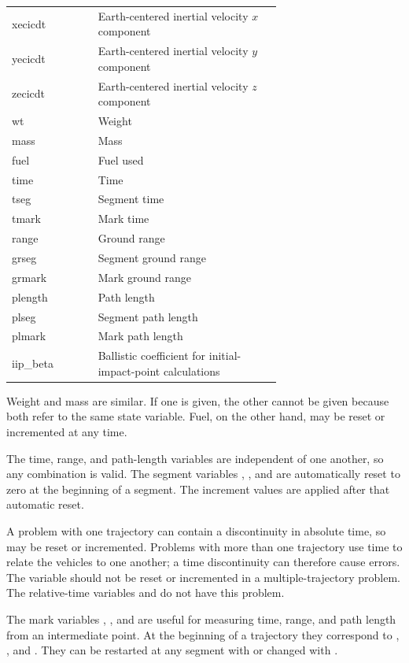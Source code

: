 \begin{longtable}{@{}>{\ttfamily}lp{0.68\linewidth}@{}}
  xecicdt   & Earth-centered inertial velocity $x$ component \\
  yecicdt   & Earth-centered inertial velocity $y$ component \\
  zecicdt   & Earth-centered inertial velocity $z$ component \\
  wt        & Weight \\
  mass      & Mass \\
  fuel      & Fuel used \\
  time      & Time \\
  tseg      & Segment time \\
  tmark     & Mark time \\
  range     & Ground range \\
  grseg     & Segment ground range \\
  grmark    & Mark ground range \\
  plength   & Path length \\
  plseg     & Segment path length \\
  plmark    & Mark path length \\
  iip\_beta & Ballistic coefficient for initial-impact-point calculations \\
  \bottomrule
\end{longtable}

Weight and mass are similar. If one is given, the other cannot be given because both
refer to the same state variable. Fuel, on the other hand, may be reset or incremented
at any time.

The time, range, and path-length variables are independent of one another, so any
combination is valid. The segment variables , , and
 are automatically reset to zero at the beginning of a segment. The
increment values are applied after that automatic reset.

A problem with one trajectory can contain a discontinuity in absolute time, so
 may be reset or incremented. Problems with more than one
trajectory use time to relate the vehicles to one another; a time discontinuity can
therefore cause errors. The variable  should not be reset or
incremented in a multiple-trajectory problem. The relative-time variables
 and  do not have this problem.

The mark variables , , and
 are useful for measuring time, range, and path length from an
intermediate point. At the beginning of a trajectory they correspond to
, , and . They can be restarted
at any segment with  or changed with
.

